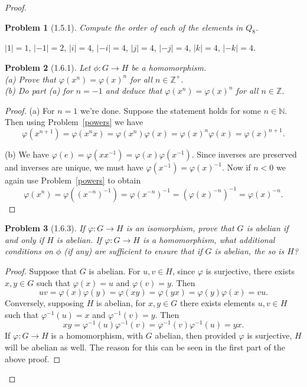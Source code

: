 \documentclass{article}
\newtheorem{problem}{Problem}
\begin{document}
\begin{proof}
\begin{problem}[1.5.1]
Compute the order of each of the elements in $Q_8$.
\end{problem}

$|1| = 1$, $|-1| = 2$, $|i| = 4$, $|-i| = 4$, $|j| = 4$, $|-j| = 4$, $|k| = 4$, $|-k| = 4$.

\begin{problem}[1.6.1]
\label{homopowers}
Let $\phi : G \to H$ be a homomorphism.\\
(a) Prove that $\varphi(x^n) = \varphi(x)^n$ for all $n \in \mathbb{Z}^+$.\\
(b) Do part (a) for $n = -1$ and deduce that $\varphi(x^n) = \varphi(x)^n$ for all $n \in \mathbb{Z}$.
\end{problem}
\begin{proof}
(a) For $n = 1$ we're done. Suppose the statement holds for some $n \in \mathbb{N}$. Then using Problem~\ref{powers} we have
\[
\varphi(x^{n+1}) = \varphi(x^nx) = \varphi(x^n) \varphi(x) = \varphi(x)^n \varphi(x) = \varphi(x)^{n+1}.
\]

(b) We have $\varphi(e) = \varphi(xx^{-1}) = \varphi(x)\varphi(x^{-1})$. Since inverses are preserved and inverses are unique, we must have $\varphi(x^{-1}) = \varphi(x)^{-1}$. Now if $n < 0$ we again use Problem~\ref{powers} to obtain
\[
\varphi(x^n) = \varphi((x^{-n})^{-1}) = \varphi(x^{-n})^{-1} = (\varphi(x)^{-n})^{-1} = \varphi(x)^{-n}.
\]
\end{proof}

\begin{problem}[1.6.3]
If $\varphi : G \to H$ is an isomorphism, prove that $G$ is abelian if and only if $H$ is abelian. If $\varphi : G \to H$ is a homomorphism, what additional conditions on $\phi$ (if any) are sufficient to ensure that if $G$ is abelian, the so is $H$?
\end{problem}
\begin{proof}
Suppose that $G$ is abelian. For $u,v \in H$, since $\varphi$ is surjective, there exists $x,y \in G$ such that $\varphi(x) = u$ and $\varphi(v) = y$. Then
\[
uv = \varphi(x)\varphi(y) = \varphi(xy) = \varphi(yx) = \varphi(y)\varphi(x) = vu.
\]
Conversely, supposing $H$ is abelian, for $x,y \in G$ there exists elements $u,v \in H$ such that $\varphi^{-1}(u) = x$ and $\varphi^{-1}(v) = y$. Then
\[
xy = \varphi^{-1}(u)\varphi^{-1}(v) = \varphi^{-1}(v)\varphi^{-1}(u) = yx.
\]
If $\varphi : G \to H$ is a homomorphism, with $G$ abelian, then provided $\varphi$ is surjective, $H$ will be abelian as well. The reason for this can be seen in the first part of the above proof.
\end{proof}


\end{proof}
\end{document}
